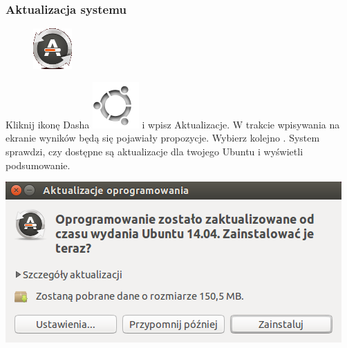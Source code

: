 \subsubsection{Aktualizacja systemu}
\label{rzeczy_do_zrobienia_po_instalacji}
\begin{figure}
	\vspace{-10pt}
	\includegraphics[width=\linewidth]{images/pierwsze_uruchomienie_aktualizacja1.png}
\end{figure}

Kliknij ikonę Dasha \includegraphics[scale=0.35]{images/ikony_dash.png} i wpisz \textcolor{ubuntu_orange}{Aktualizacje}. W trakcie wpisywania na ekranie wyników będą się pojawiały propozycje. Wybierz kolejno .
System sprawdzi, czy dostępne są aktualizacje dla twojego Ubuntu i wyświetli podsumowanie.
\begin{center}
	\includegraphics{images/pierwsze_uruchomienie_aktualizacja2.png}
\end{center}

